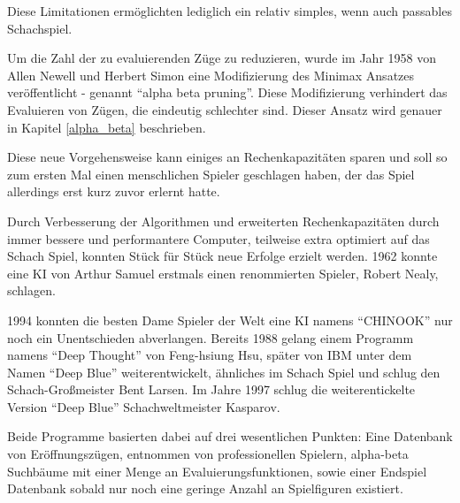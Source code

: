 
Diese Limitationen ermöglichten lediglich ein relativ simples, wenn auch passables Schachspiel.


Um die Zahl der zu evaluierenden Züge zu reduzieren, wurde im Jahr 1958 von Allen Newell und Herbert Simon eine Modifizierung des Minimax Ansatzes veröffentlicht - genannt ``alpha beta pruning''. Diese Modifizierung verhindert das Evaluieren von Zügen, die eindeutig schlechter sind. Dieser Ansatz wird genauer in Kapitel \ref{alpha_beta} beschrieben. \cite{Newell2010}


Diese neue Vorgehensweise kann einiges an Rechenkapazitäten sparen und soll so zum ersten Mal einen menschlichen Spieler geschlagen haben, der das Spiel allerdings erst kurz zuvor erlernt hatte. \cite{Kurenkov2019}

Durch Verbesserung der Algorithmen und erweiterten Rechenkapazitäten durch immer bessere und performantere Computer, teilweise extra optimiert auf das Schach Spiel, konnten Stück für Stück neue Erfolge erzielt werden. 1962 konnte eine KI von Arthur Samuel erstmals einen renommierten Spieler, Robert Nealy, schlagen. \cite{Kurenkov2019}

1994 konnten die besten Dame Spieler der Welt eine KI namens ``CHINOOK'' nur noch ein Unentschieden abverlangen. \cite{Schaeffer1996} Bereits 1988 gelang einem Programm namens ``Deep Thought'' von Feng-hsiung Hsu, später von IBM unter dem Namen ``Deep Blue'' weiterentwickelt, ähnliches im Schach Spiel und schlug den Schach-Großmeister Bent Larsen. Im Jahre 1997 schlug die weiterentickelte Version ``Deep Blue'' Schachweltmeister Kasparov.\cite{Kurenkov2019}

Beide Programme basierten dabei auf drei wesentlichen Punkten: Eine Datenbank von Eröffnungszügen, entnommen von professionellen Spielern, alpha-beta Suchbäume mit einer Menge an Evaluierungsfunktionen, sowie einer Endspiel Datenbank sobald nur noch eine geringe Anzahl an Spielfiguren existiert. \cite{Kurenkov2019}

